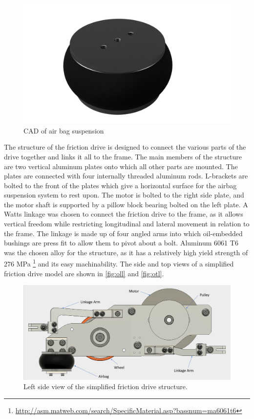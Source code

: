 \documentclass[main.tex]{subfiles}
\begin{document}
\begin{figure}[H]
\includegraphics[width=\textwidth]{images/fig3}
\caption{CAD of air bag suspension}\label{fig:cad-air-bag}
\end{figure}

    The structure of the friction drive is designed to connect the various parts of the drive together and links it all to the frame. The main members of the structure are two vertical aluminum plates onto which all other parts are mounted. The plates are connected with four internally threaded aluminum rods. L-brackets are bolted to the front of the plates which give a horizontal surface for the airbag suspension system to rest upon. The motor is bolted to the right side plate, and the motor shaft is supported by a pillow block bearing bolted on the left plate. A Watts linkage was chosen to connect the friction drive to the frame, as it allows vertical freedom while restricting longitudinal and lateral movement in relation to the frame. The linkage is made up of four angled arms into which oil-embedded bushings are press fit to allow them to pivot about a bolt. Aluminum 6061 T6 was the chosen alloy for the structure, as it has a relatively high yield strength of 276 MPa \footnote{\url{http://asm.matweb.com/search/SpecificMaterial.asp?bassnum=ma6061t6}} and its easy machinability. The side and top views of a simplified friction drive model are shown in \autoref{fig:oll} and \autoref{fig:otl}.

\begin{figure}[H]
\includegraphics[width=\textwidth]{images/OrthoLeftLabelled.png}
\caption{Left side view of the simplified friction drive structure.}\label{fig:oll}
\end{figure}
\end{document}
